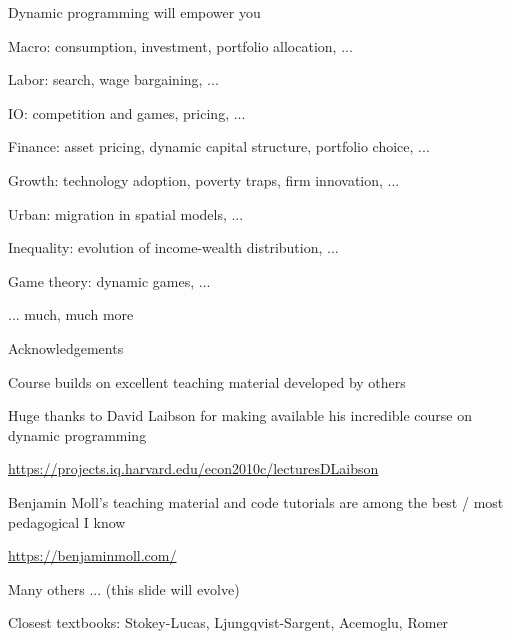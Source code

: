 \documentclass[11pt, aspectratio=169]{beamer}
\newenvironment{witemize}{\itemize\addtolength{\itemsep}{10pt}}{\enditemize}
\begin{document}
\begin{frame}{Dynamic programming will empower you}
\begin{witemize}
\item Macro: consumption, investment, portfolio allocation, ... 

\item Labor: search, wage bargaining, ... 

\item IO: competition and games, pricing, ...

\item Finance: asset pricing, dynamic capital structure, portfolio choice, ... 

\item Growth: technology adoption, poverty traps, firm innovation, ... 

\item Urban: migration in spatial models, ... 

\item Inequality: evolution of income-wealth distribution, ... 

\item Game theory: dynamic games, ... 

\item ... much, much more 

\end{witemize}
\end{frame}



\begin{frame}{Acknowledgements}

\begin{witemize}
\item Course builds on excellent teaching material developed by others

\item Huge thanks to David Laibson for making available his incredible course on dynamic programming 

\url{https://projects.iq.harvard.edu/econ2010c/lecturesDLaibson}

\item Benjamin Moll's teaching material and code tutorials are among the best / most pedagogical I know

\url{https://benjaminmoll.com/}

\item Many others ... (this slide will evolve)

\item Closest textbooks: Stokey-Lucas, Ljungqvist-Sargent, Acemoglu, Romer

\end{witemize}
\end{frame}
\end{document}
